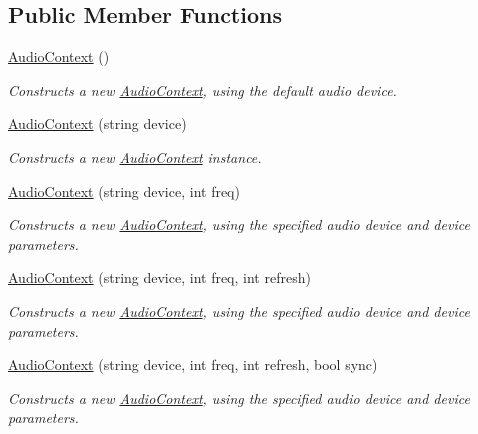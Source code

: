 \subsection*{Public Member Functions}
\begin{DoxyCompactItemize}
\item 
\hyperlink{class_open_t_k_1_1_audio_1_1_audio_context_a67dcf4c26382b5230c495787881ea24d}{Audio\-Context} ()
\begin{DoxyCompactList}\small\item\em Constructs a new \hyperlink{class_open_t_k_1_1_audio_1_1_audio_context}{Audio\-Context}, using the default audio device.\end{DoxyCompactList}\item 
\hyperlink{class_open_t_k_1_1_audio_1_1_audio_context_a838a89f8a5f73958787069e708a3c757}{Audio\-Context} (string device)
\begin{DoxyCompactList}\small\item\em Constructs a new \hyperlink{class_open_t_k_1_1_audio_1_1_audio_context}{Audio\-Context} instance. \end{DoxyCompactList}\item 
\hyperlink{class_open_t_k_1_1_audio_1_1_audio_context_a2d59b0b019a649f59bd2d2fe42a2aa1b}{Audio\-Context} (string device, int freq)
\begin{DoxyCompactList}\small\item\em Constructs a new \hyperlink{class_open_t_k_1_1_audio_1_1_audio_context}{Audio\-Context}, using the specified audio device and device parameters.\end{DoxyCompactList}\item 
\hyperlink{class_open_t_k_1_1_audio_1_1_audio_context_a032dd59f508aaf6e21cd020004ad78b3}{Audio\-Context} (string device, int freq, int refresh)
\begin{DoxyCompactList}\small\item\em Constructs a new \hyperlink{class_open_t_k_1_1_audio_1_1_audio_context}{Audio\-Context}, using the specified audio device and device parameters.\end{DoxyCompactList}\item 
\hyperlink{class_open_t_k_1_1_audio_1_1_audio_context_ace1d50b8e25d332413dd103924146102}{Audio\-Context} (string device, int freq, int refresh, bool sync)
\begin{DoxyCompactList}\small\item\em Constructs a new \hyperlink{class_open_t_k_1_1_audio_1_1_audio_context}{Audio\-Context}, using the specified audio device and device parameters.\end{DoxyCompactList}\item 

\end{DoxyCompactItemize}
